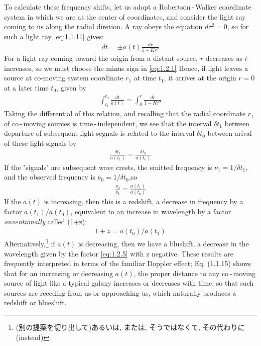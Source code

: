 \documentclass[11pt]{ltjsarticle}
\theoremstyle{plain}
\theoremstyle{break}
\begin{document}
To calculate these frequency shifts, let us adopt a Robertson\,-\,Walker coordinate system in which we are at the center of coordinates, and consider the light ray coming to us along the radial diretion.
A ray obeys the equation $d\tau^2 = 0$, so for such a light ray \eqref{eq:1.1.11} gives:
\begin{align}
  dt = \pm a(t) \frac{dr}{1- Kr^2} \label{eq:1.2.1}
\end{align}
For a light ray coming toward the origin from a distant source, $r$ decreases as $t$ increases, so we must choose the minus sign in \eqref{eq:1.2.1}
Hence, if light leaves a source at co-moving system coordinate $r_1$ at time $t_1$, it arrives at the origin $r=0$ at a later time $t_0$, given by
\begin{align}
  \int_{t_1}^{t_0}\frac{dt}{a(t)} = \int_{0}^{r} \frac{dr}{1-Kr^2} \label{eq:1.2.2}
\end{align}
Taking the differential of this relation, and recalling that the radial coordinate $r_1$ of co\,-\,moving sources is time\,-\,independent,
we see that the interval $\delta t_1$ between departure of subsequent light segnals is related to the interval $\delta t_0$ between arival of these light signals by
\begin{align}
  \frac{\delta{t_1}}{a(t_1)} =   \frac{\delta{t_0}}{a(t_0)}
\end{align}
If the "signals" are subsequent wave crests, the emitted frequency is $\nu_1 = 1/\delta{t_1}$, and the observed frequency is $\nu_0=1/\delta{t_0}$,so
\begin{align}
  \frac{\nu_0}{\nu_1} = \frac{a(t_1)}{a(t_0)}
\end{align}
If the $a(t)$ is increasing, then this is a redshift, a decrease in frequency by a factor $a(t_1)/a(t_0)$, equivalent to an increase in wavelength by a factor \textit{onventionally} called (1+z):
\begin{align}
  1+z = a(t_0)/a(t_1) \label{eq:1.2.5}
\end{align}
Alternatively,\footnote{(別の提案を切り出して)あるいは, または, そうではなくて, その代わりに(instead) }
if $a(t)$ is decreasing, then we have a blushift, a decrease in the wavelength given by the factor \eqref{eq:1.2.5} with z negative.
These results are frequently interpreted in terms of the familiar Doppler effect; Eq. (1.1.15) shows that for an increasing or decreasing $a(t)$,
 the proper distance to any co\,-\,moving source of light like a typical galaxy increases or decreases with time, so that such sources are receding from us or approaching us, which naturally produces a redshift or blueshift.
\end{document}
